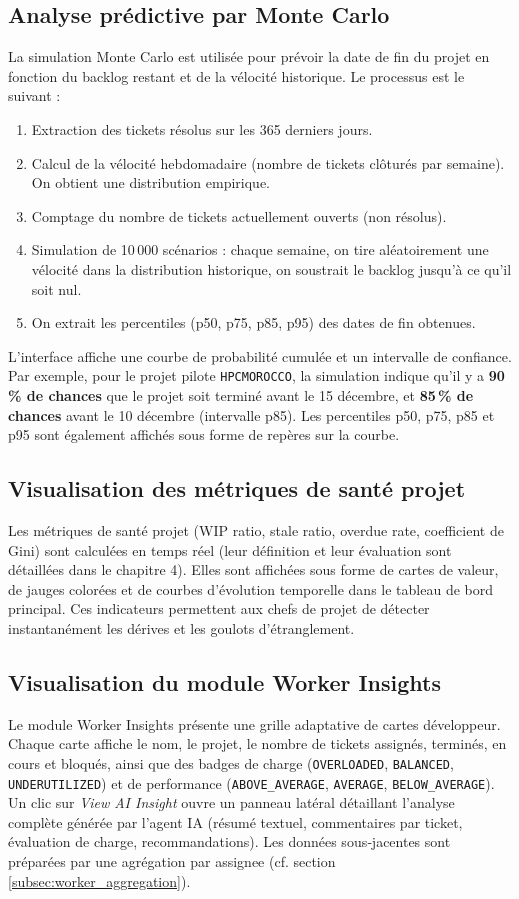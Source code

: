 \subsection{Analyse prédictive par Monte Carlo}
\label{subsec:montecarlo_visu}
La simulation Monte Carlo est utilisée pour prévoir la date de fin du projet en fonction du backlog restant et de la vélocité historique. Le processus est le suivant :
\begin{enumerate}
    \item Extraction des tickets résolus sur les 365 derniers jours.
    \item Calcul de la vélocité hebdomadaire (nombre de tickets clôturés par semaine). On obtient une distribution empirique.
    \item Comptage du nombre de tickets actuellement ouverts (non résolus).
    \item Simulation de 10\,000 scénarios : chaque semaine, on tire aléatoirement une vélocité dans la distribution historique, on soustrait le backlog jusqu’à ce qu’il soit nul.
    \item On extrait les percentiles (p50, p75, p85, p95) des dates de fin obtenues.
\end{enumerate}
L’interface affiche une courbe de probabilité cumulée et un intervalle de confiance. Par exemple, pour le projet pilote \texttt{HPCMOROCCO}, la simulation indique qu’il y a \textbf{90\,\% de chances} que le projet soit terminé avant le 15 décembre, et \textbf{85\,\% de chances} avant le 10 décembre (intervalle p85). Les percentiles p50, p75, p85 et p95 sont également affichés sous forme de repères sur la courbe.

\subsection{Visualisation des métriques de santé projet}
Les métriques de santé projet (WIP ratio, stale ratio, overdue rate, coefficient de Gini) sont calculées en temps réel (leur définition et leur évaluation sont détaillées dans le chapitre 4). Elles sont affichées sous forme de cartes de valeur, de jauges colorées et de courbes d’évolution temporelle dans le tableau de bord principal. Ces indicateurs permettent aux chefs de projet de détecter instantanément les dérives et les goulots d’étranglement.

\subsection{Visualisation du module Worker Insights}
Le module Worker Insights présente une grille adaptative de cartes développeur. Chaque carte affiche le nom, le projet, le nombre de tickets assignés, terminés, en cours et bloqués, ainsi que des badges de charge (\texttt{OVERLOADED}, \texttt{BALANCED}, \texttt{UNDERUTILIZED}) et de performance (\texttt{ABOVE\_AVERAGE}, \texttt{AVERAGE}, \texttt{BELOW\_AVERAGE}). Un clic sur \textit{View AI Insight} ouvre un panneau latéral détaillant l’analyse complète générée par l’agent IA (résumé textuel, commentaires par ticket, évaluation de charge, recommandations). Les données sous‑jacentes sont préparées par une agrégation par assignee (cf. section \ref{subsec:worker_aggregation}).

